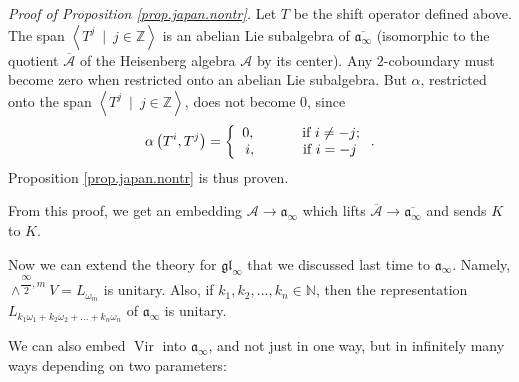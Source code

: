 \documentclass
[numbers=enddot,12pt,final,onecolumn,german,notitlepage]{scrartcl}%
\theoremstyle{definition}
\begin{document}
\textit{Proof of Proposition \ref{prop.japan.nontr}.} Let $T$ be the shift
operator defined above. The span $\left\langle T^{j}\ \mid\ j\in
\mathbb{Z}\right\rangle $ is an abelian Lie subalgebra of $\overline
{\mathfrak{a}_{\infty}}$ (isomorphic to the quotient $\overline{\mathcal{A}}$
of the Heisenberg algebra $\mathcal{A}$ by its center). Any $2$-coboundary
must become zero when restricted onto an abelian Lie subalgebra. But $\alpha$,
restricted onto the span $\left\langle T^{j}\ \mid\ j\in\mathbb{Z}%
\right\rangle $, does not become $0$, since%
\[
\alpha\left(  T^{i},T^{j}\right)  =\left\{
\begin{array}
[c]{c}%
0,\ \ \ \ \ \ \ \ \ \ \text{if }i\neq-j;\\
i,\ \ \ \ \ \ \ \ \ \ \text{if }i=-j
\end{array}
\right.  .
\]
Proposition \ref{prop.japan.nontr} is thus proven.

From this proof, we get an embedding $\mathcal{A}\rightarrow\mathfrak{a}%
_{\infty}$ which lifts $\overline{\mathcal{A}}\rightarrow\overline
{\mathfrak{a}_{\infty}}$ and sends $K$ to $K$.

Now we can extend the theory for $\mathfrak{gl}_{\infty}$ that we discussed
last time to $\mathfrak{a}_{\infty}$. Namely, $\wedge^{\dfrac{\infty}{2}%
,m}V=L_{\omega_{m}}$ is unitary. Also, if $k_{1},k_{2},...,k_{n}\in\mathbb{N}%
$, then the representation $L_{k_{1}\omega_{1}+k_{2}\omega_{2}+...+k_{n}%
\omega_{n}}$ of $\mathfrak{a}_{\infty}$ is unitary.

We can also embed $\operatorname*{Vir}$ into $\mathfrak{a}_{\infty}$, and not
just in one way, but in infinitely many ways depending on two parameters:
\end{document}
